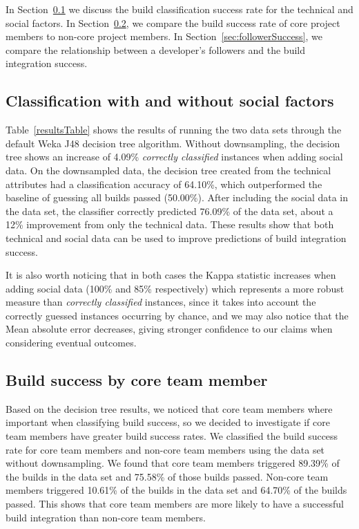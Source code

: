 \documentclass[10pt, conference]{IEEEtran}
\begin{document}
In Section~\ref{sec:successClassification} we discuss the build classification
success rate for the technical and social factors.  In Section~\ref{sec:core},
we compare the build success rate of core project members to non-core project
members.  In Section~\ref{sec:followerSuccess}, we compare the relationship
between a developer's followers and the build integration success.

\subsection{Classification with and without social factors}
\label{sec:successClassification}

Table~\ref{resultsTable} shows the results of running the two data sets through the
default Weka J48 decision tree algorithm.  Without downsampling, the 
decision tree shows an increase of 4.09\% \textit{correctly classified} instances when adding social data. On the downsampled data, the decision tree created from the technical attributes
had a classification accuracy of 64.10\%, which outperformed the baseline of
guessing all builds passed (50.00\%).
 After including the social data
in the data set, the classifier correctly predicted 76.09\% of the data set,
about a 12\% improvement from only the technical data.  These results show that
both technical and social data can be used to improve predictions of build 
integration success.

It is also worth noticing that in both cases the Kappa statistic increases when
adding social data (100\% and 85\% respectively) which represents a more robust
measure than \textit{correctly classified} instances, since it takes into account the
correctly guessed instances occurring by chance, and we may also notice that the
Mean absolute error decreases, giving stronger confidence to our claims when
considering eventual outcomes. 

\subsection{Build success by core team member}
\label{sec:core}


Based on the decision tree results, we noticed that core team members where
important when classifying build success, so we decided to investigate if core
team members have greater build success rates.
We classified the build success rate for
core team members and non-core team members using the data set without 
downsampling.  We found that core team members
triggered 89.39\% of the builds in the data set and 75.58\% of those builds
passed.  Non-core team members triggered 10.61\% of the builds in the data set
and 64.70\% of the builds passed.  This shows that core team members are more
likely to have a successful build integration than non-core team members.
\end{document}
